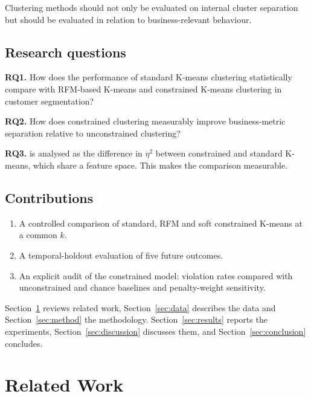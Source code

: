\documentclass[conference,10pt]{IEEEtran}
\newcommand{\etasq}{\eta^{2}}
\begin{document}
Clustering methods should not only be evaluated on internal cluster separation but should be evaluated in relation to business-relevant behaviour. 

\subsection{Research questions}
\textbf{RQ1.} How does the performance of standard K-means clustering
statistically compare with RFM-based K-means and constrained K-means
clustering in customer segmentation?

\textbf{RQ2.} How does constrained clustering measurably improve
business-metric separation relative to unconstrained clustering?

\textbf{RQ3.} is analysed as the difference in $\etasq$ between constrained and
standard K-means, which share a feature space. This makes the comparison
measurable.

\subsection{Contributions}
\begin{enumerate}
  \item A controlled comparison of standard, RFM and soft constrained K-means
  at a common $k$.
  \item A temporal-holdout evaluation of five future outcomes.
  \item An explicit audit of the constrained model: violation rates compared
  with unconstrained and chance baselines and penalty-weight sensitivity.
\end{enumerate}

Section~\ref{sec:related} reviews related work, Section~\ref{sec:data}
describes the data and Section~\ref{sec:method} the methodology.
Section~\ref{sec:results} reports the experiments, Section~\ref{sec:discussion}
discusses them, and Section~\ref{sec:conclusion} concludes.

\section{Related Work}
\label{sec:related}
\end{document}
